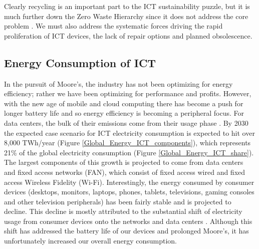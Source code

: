 \documentclass{article}
\begin{document}
Clearly recycling is an important part to the ICT sustainability puzzle, but it is much further down the Zero Waste Hierarchy since it does not address the core problem \cite{zerowastecanada2017hierarchy}. We must also address the systematic forces driving the rapid proliferation of ICT devices, the lack of repair options and planned obsolescence.

\subsection{Energy Consumption of ICT} \label{SECTION_ENERGY_CONSUMPTION}
In the pursuit of Moore's, the industry has not been optimizing for energy efficiency; rather we have been optimizing for performance and profits. However, with the new age of mobile and cloud computing there has become a push for longer battery life \cite{waldrop2016chips} and so energy efficiency is becoming a peripheral focus. For data centers, the bulk of their emissions come from their usage phase \cite{andrae2015global, malmodin2014life, irishtimes2016datacentre}. By 2030 the expected case scenario for ICT electricity consumption is expected to hit over 8,000 TWh/year (Figure \ref{Global_Energy_ICT_components}), which represents 21\% of the global electricity consumption (Figure \ref{Global_Energy_ICT_share}). The largest components of this growth is projected to come from data centers and fixed access networks (FAN), which consist of fixed access wired and fixed access Wireless Fidelity (Wi-Fi). Interestingly, the energy consumed by consumer devices (desktops, monitors, laptops, phones, tablets, televisions, gaming consoles and other television peripherals) has been fairly stable and is projected to decline. This decline is mostly attributed to the substantial shift of electricity usage from consumer devices onto the networks and data centers \cite{andrae2015global}. Although this shift has addressed the battery life of our devices and prolonged Moore's, it has unfortunately increased our overall energy consumption.
\end{document}
